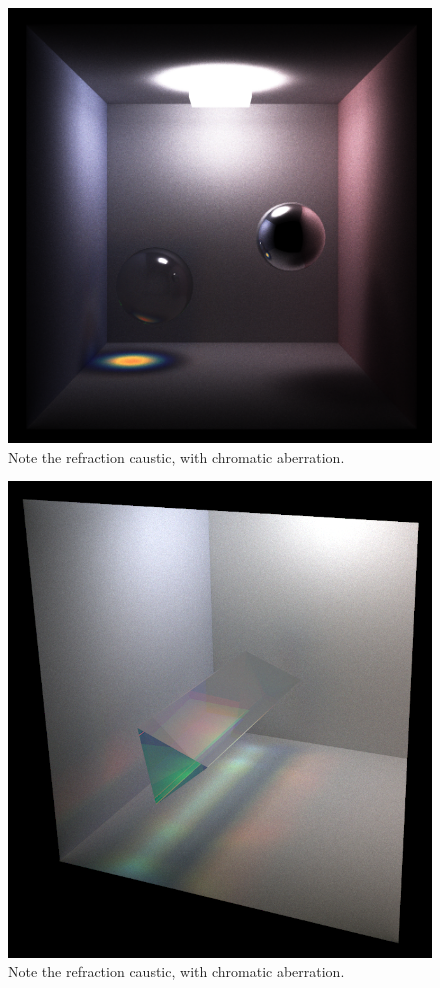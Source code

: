\documentclass[12pt]{article}
\begin{document}
\begin{figure} 
\centering
  \includegraphics[width = 6 in]{v_rt_reflect_chromatic_aberration_low_res.png}
  \caption{ Note the refraction caustic, with chromatic aberration.
}
\end{figure}

\begin{figure} 
\centering
  \includegraphics[width = 6 in]{v_rt_reflect_prism.png}
  \caption{ Note the refraction caustic, with chromatic aberration.
}
\end{figure}
\end{document}
